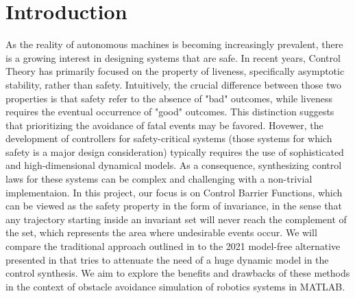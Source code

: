 \section*{Introduction}
As the reality of autonomous machines is becoming increasingly prevalent, there is a growing interest in designing systems that are safe. In recent years, Control Theory has primarily focused on the property of liveness, specifically asymptotic stability, rather than safety.
Intuitively, the crucial difference between those two properties is  that safety refer to the absence of "bad" outcomes, while liveness requires the eventual occurrence of "good" outcomes. This distinction suggests that prioritizing the avoidance of fatal events may be favored.
Hovewer, the development of controllers for safety-critical systems (those systems for which safety is a major design consideration) typically requires the use of sophisticated and high-dimensional dynamical models. As a consequence, synthesizing control laws for these systems can be complex and challenging  with a non-trivial implementaion. 
In this project, our focus is on Control Barrier Functions, which can be viewed as the safety property in the form of invariance, in the sense that any trajectory starting inside an invariant set will never reach the complement of the set, which represents the area where undesirable events occur. We will compare the traditional approach outlined in \cite{cbf} to the 2021 model-free alternative presented in \cite{mfcbf} that tries to attenuate the need of a huge dynamic model in the control synthesis. We aim to explore the benefits and drawbacks of these methods in the context of obstacle avoidance simulation of robotics systems in MATLAB.